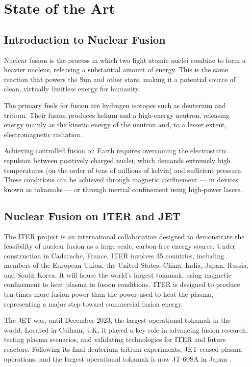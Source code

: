 \chapter{State of the Art} \label{sec:cap2}

\section{Introduction to Nuclear Fusion}

Nuclear fusion is the process in which two light atomic nuclei combine to form a heavier nucleus, releasing a substantial amount of energy. This is the same reaction that powers the Sun and other stars, making it a potential source of clean, virtually limitless energy for humanity.

The primary fuels for fusion are hydrogen isotopes such as deuterium and tritium. Their fusion produces helium and a high-energy neutron, releasing energy mainly as the kinetic energy of the neutron and, to a lesser extent, electromagnetic radiation.

Achieving controlled fusion on Earth requires overcoming the electrostatic repulsion between positively charged nuclei, which demands extremely high temperatures (on the order of tens of millions of kelvin) and sufficient pressure. These conditions can be achieved through magnetic confinement — in devices known as tokamaks — or through inertial confinement using high-power lasers.


\section{Nuclear Fusion on \acs{ITER} and \acs{JET}}

The \ac{ITER} project is an international collaboration designed to demonstrate the feasibility of nuclear fusion as a large-scale, carbon-free energy source. Under construction in Cadarache, France, ITER involves 35 countries, including members of the European Union, the United States, China, India, Japan, Russia, and South Korea. It will house the world's largest tokamak, using magnetic confinement to heat plasma to fusion conditions.\ \ac{ITER} is designed to produce ten times more fusion power than the power used to heat the plasma, representing a major step toward commercial fusion energy.

The \ac{JET} was, until December 2023, the largest operational tokamak in the world. Located in Culham, UK, it played a key role in advancing fusion research, testing plasma scenarios, and validating technologies for \ac{ITER} and future reactors. Following its final deuterium-tritium experiments, JET ceased plasma operations, and the largest operational tokamak is now JT-60SA in Japan \autocite{JT60SACertifiedWorlds2024,FusionenergyQuestMakes2024}.

